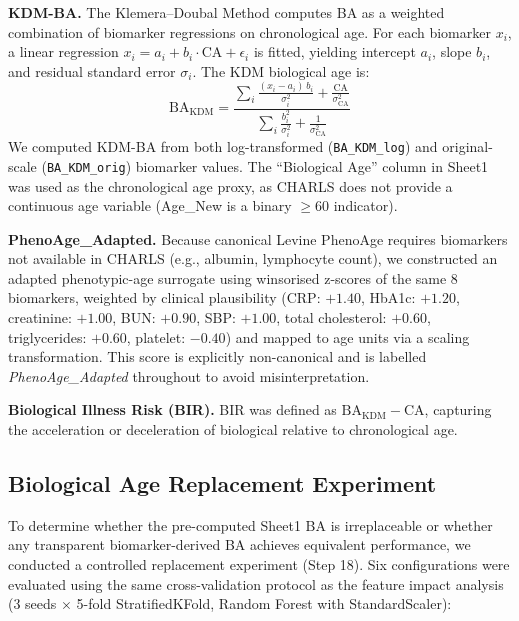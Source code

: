 \documentclass[11pt,a4paper]{article}
\begin{document}
\textbf{KDM-BA.} The Klemera--Doubal Method\cite{Klemera2006} computes BA as a weighted combination
of biomarker regressions on chronological age. For each biomarker $x_i$, a linear regression
$x_i = a_i + b_i \cdot \text{CA} + \epsilon_i$ is fitted, yielding intercept $a_i$, slope $b_i$, and
residual standard error $\sigma_i$. The KDM biological age is:
\[
\text{BA}_{\text{KDM}} = \frac{\sum_i \frac{(x_i - a_i)\, b_i}{\sigma_i^2} + \frac{\text{CA}}{\sigma_{\text{CA}}^2}}
{\sum_i \frac{b_i^2}{\sigma_i^2} + \frac{1}{\sigma_{\text{CA}}^2}}
\]
We computed KDM-BA from both log-transformed (\texttt{BA\_KDM\_log}) and original-scale
(\texttt{BA\_KDM\_orig}) biomarker values. The ``Biological Age'' column in Sheet1 was used as the
chronological age proxy, as CHARLS does not provide a continuous age variable (Age\_New is a binary
$\geq 60$ indicator).

\textbf{PhenoAge\_Adapted.} Because canonical Levine PhenoAge\cite{Levine2018} requires biomarkers
not available in CHARLS (e.g., albumin, lymphocyte count), we constructed an adapted phenotypic-age
surrogate using winsorised z-scores of the same 8 biomarkers, weighted by clinical plausibility
(CRP: $+1.40$, HbA1c: $+1.20$, creatinine: $+1.00$, BUN: $+0.90$, SBP: $+1.00$,
total cholesterol: $+0.60$, triglycerides: $+0.60$, platelet: $-0.40$) and mapped to age units via
a scaling transformation. This score is explicitly non-canonical and is labelled \emph{PhenoAge\_Adapted}
throughout to avoid misinterpretation.

\textbf{Biological Illness Risk (BIR).} BIR was defined as $\text{BA}_{\text{KDM}} - \text{CA}$,
capturing the acceleration or deceleration of biological relative to chronological age.

\subsection{Biological Age Replacement Experiment}
\label{sec:ba-replace}

To determine whether the pre-computed Sheet1 BA is irreplaceable or whether any transparent
biomarker-derived BA achieves equivalent performance, we conducted a controlled replacement
experiment (Step 18). Six configurations were evaluated using the same cross-validation protocol
as the feature impact analysis (3 seeds $\times$ 5-fold StratifiedKFold, Random Forest with
StandardScaler):
\end{document}
